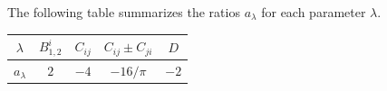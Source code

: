 The following table summarizes the ratios $a_\lambda$ for each parameter $\lambda$.
\begin{center}
\begin{tabular}{|c|c|c|c|c|}
    \hline$\lambda$ & $B_{1,2}^i$ & $C_{i j}$ & $C_{i j} \pm C_{j i}$ & $D$ \\
    \hline$a_\lambda$ & $2$ & $-4$ & $-16 / \pi$ & $-2$ \\
    \hline
\end{tabular}
\end{center}

